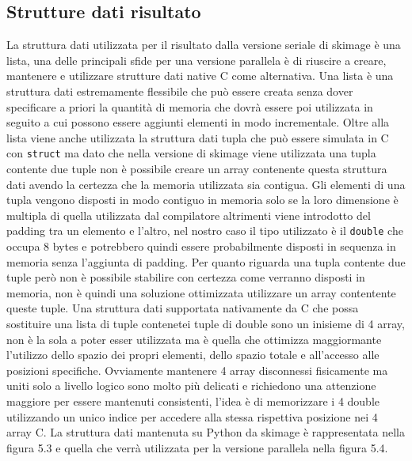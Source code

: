 \documentclass[12pt,a4paper]{report}
\begin{document}
\subsection{Strutture dati risultato}
La struttura dati utilizzata per il risultato dalla versione seriale di skimage è una lista, una delle principali sfide per una versione parallela è di riuscire a creare, mantenere e utilizzare strutture dati native C come alternativa. 
Una lista è una struttura dati estremamente flessibile che può essere creata senza dover specificare a priori la quantità di memoria che dovrà essere poi utilizzata in seguito a cui possono essere aggiunti elementi in modo incrementale. 
Oltre alla lista viene anche utilizzata la struttura dati tupla che può essere simulata in C con \verb|struct| ma dato che nella versione di skimage viene utilizzata una tupla contente due tuple non è possibile creare un array contenente questa struttura dati avendo la certezza che la memoria utilizzata sia contigua. Gli elementi di una tupla vengono disposti in modo contiguo in memoria solo se la loro dimensione è multipla di quella utilizzata dal compilatore altrimenti viene introdotto del padding tra un elemento e l'altro, nel nostro caso il tipo utilizzato è il \verb|double| che occupa 8 bytes e potrebbero quindi essere probabilmente disposti in sequenza in memoria senza l'aggiunta di padding. Per quanto riguarda una tupla contente due tuple però non è possibile stabilire con certezza come verranno disposti in memoria, non è quindi una soluzione ottimizzata utilizzare un array contentente queste tuple. \newline
Una struttura dati supportata nativamente da C che possa sostituire una lista di tuple contenetei tuple di double sono un inisieme di 4 array, non è la sola a poter esser utilizzata ma è quella che ottimizza maggiormante l'utilizzo dello spazio dei propri elementi, dello spazio totale e all'accesso alle posizioni specifiche. Ovviamente mantenere 4 array disconnessi fisicamente ma uniti solo a livello logico sono molto più delicati e richiedono una attenzione maggiore per essere mantenuti consistenti, l'idea è di memorizzare i 4 double utilizzando un unico indice per accedere alla stessa rispettiva posizione nei 4 array C. \newline
La struttura dati mantenuta su Python da skimage è rappresentata nella figura 5.3 e quella che verrà utilizzata per la versione parallela nella figura 5.4. \newline
\end{document}

